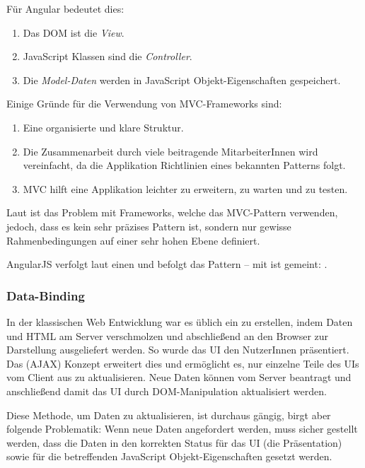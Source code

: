 \newpage
Für Angular bedeutet dies:
\begin{enumerate}
  \item Das DOM ist die \textit{View}.
  \item JavaScript Klassen sind die \textit{Controller}.
  \item Die \textit{Model-Daten} werden in JavaScript Objekt-Eigenschaften gespeichert.
\end{enumerate}

Einige Gründe für die Verwendung von MVC-Frameworks sind:
\begin{enumerate}
  \item Eine organisierte und klare Struktur.
  \item Die Zusammenarbeit durch viele beitragende MitarbeiterInnen wird vereinfacht, da die Applikation Richtlinien eines bekannten Patterns folgt.
  \item MVC hilft eine Applikation leichter zu erweitern, zu warten und zu testen.
\end{enumerate}

Laut \cite[12]{Kozlowski:2013} ist das Problem mit Frameworks, welche das MVC-Pattern verwenden, jedoch, dass es kein sehr präzises Pattern ist, sondern nur gewisse Rahmenbedingungen auf einer sehr hohen Ebene definiert.

AngularJS verfolgt laut \cite[13]{Kozlowski:2013} einen  und befolgt das  Pattern -- mit  ist gemeint:  \autocite{Angular:GooglePlus}.

\subsubsection{Data-Binding}
In der klassischen Web Entwicklung war es üblich ein  zu erstellen, indem Daten und HTML am Server verschmolzen und abschließend an den Browser zur Darstellung ausgeliefert werden. So wurde das UI den NutzerInnen präsentiert. Das  (AJAX) Konzept erweitert dies und ermöglicht es, nur einzelne Teile des UIs vom Client aus zu aktualisieren. Neue Daten können vom Server beantragt und anschließend damit das UI durch DOM-Manipulation aktualisiert werden.

Diese Methode, um Daten zu aktualisieren, ist durchaus gängig, birgt aber folgende Problematik: Wenn neue Daten angefordert werden, muss sicher gestellt werden, dass die Daten in den korrekten Status für das UI (die Präsentation) sowie für die betreffenden JavaScript Objekt-Eigenschaften gesetzt werden.

